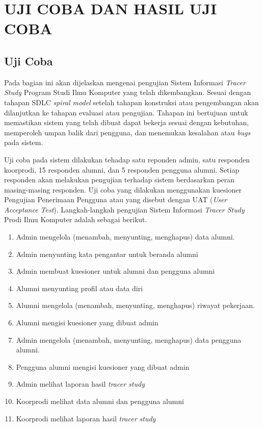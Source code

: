 
\chapter{UJI COBA DAN HASIL UJI COBA}

\section{Uji Coba}
Pada bagian ini akan dijelaskan mengenai pengujian Sistem Informasi \textit{Tracer Study} Program Studi Ilmu Komputer yang telah dikembangkan. Sesuai dengan tahapan SDLC \textit{spiral model} setelah tahapan konstruksi atau pengembangan akan dilanjutkan ke tahapan evaluasi atau pengujian. Tahapan ini bertujuan untuk memastikan sistem yang telah dibuat dapat bekerja sesuai dengan kebutuhan, memperoleh umpan balik dari pengguna, dan menemukan kesalahan atau \textit{bugs} pada sistem. 

Uji coba pada sistem dilakukan tehadap satu reponden admin, satu responden koorprodi, 15 responden alumni, dan 5 responden pengguna alumni. Setiap responden akan melakukan pengujian terhadap sistem berdasarkan peran masing-masing responden. Uji coba yang dilakukan menggunakan kuesioner Pengujian Penerimaan Pengguna atau yang disebut dengan UAT (\textit{User Acceptance Test}). Langkah-langkah pengujian Sistem Informasi \textit{Tracer Study} Prodi Ilmu Komputer adalah sebagai berikut. 

\begin{enumerate}
	\item Admin mengelola (menambah, menyunting, menghapus) data alumni. 
	\item Admin menyunting kata pengantar untuk beranda alumni
	\item Admin membuat kuesioner untuk alumni dan pengguna alumni
	\item Alumni menyunting profil atau data diri
	\item Alumni mengelola  (menambah, menyunting, menghapus) riwayat pekerjaan. 
	\item Alumni mengisi kuesioner yang dibuat admin
	\item Admin mengelola (menambah, menyunting, menghapus) data pengguna alumni.
	\item Pengguna alumni mengisi kuesioner yang dibuat admin
	\item Admin melihat laporan hasil \textit{tracer study}
	\item Koorprodi melihat data alumni dan pengguna alumni
	\item Koorprodi melihat laporan hasil \textit{tracer study}
\end{enumerate}

